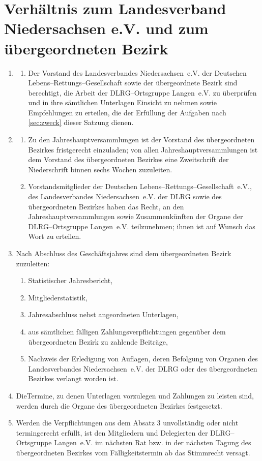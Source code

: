\documentclass[%
12pt, %
a4paper, %
headsepline, %
parskip, %
headings=normal, %
]{scrreprt}
\begin{document}
\section{Verhältnis zum Landesverband Niedersachsen e.V. und zum übergeordneten Bezirk}
\label{sec:verhaeltnis}
\begin{enumerate}
    \item \begin{enumerate}[noitemsep]
        \item Der Vorstand des Landesverbandes Niedersachsen~e.V. der Deutschen Lebens--Rettungs--Gesellschaft sowie der übergeordnete Bezirk sind berechtigt, die Arbeit der DLRG--Ortsgruppe Langen~e.V. zu überprüfen und in ihre sämtlichen Unterlagen Einsicht zu nehmen sowie Empfehlungen zu erteilen, die der Erfüllung der Aufgaben nach \ref{sec:zweck} dieser Satzung dienen.
      \end{enumerate}
    \item \begin{enumerate}[noitemsep]
        \item Zu den Jahreshauptversammlungen ist der Vorstand des übergeordneten Bezirkes fristgerecht einzuladen; von allen Jahreshauptversammlungen ist dem Vorstand des übergeordneten Bezirkes eine Zweitschrift der Niederschrift binnen sechs Wochen zuzuleiten.
        \item Vorstandsmitglieder der Deutschen Lebens--Rettungs--Gesellschaft~e.V., des Landesverbandes Niedersachsen~e.V. der DLRG sowie des übergeordneten Bezirkes haben das Recht, an den Jahreshauptversammlungen sowie Zusammenkünften der Organe der DLRG--Ortsgruppe Langen~e.V. teilzunehmen; ihnen ist auf Wunsch das Wort zu erteilen.
      \end{enumerate}
    \item Nach Abschluss des Geschäftsjahres sind dem übergeordneten Bezirk zuzuleiten: \begin{enumerate}[noitemsep]
        \item Statistischer Jahresbericht,
        \item Mitgliederstatistik,
        \item Jahresabschluss nebst angeordneten Unterlagen,
        \item aus sämtlichen fälligen Zahlungsverpflichtungen gegenüber dem übergeordneten Bezirk zu zahlende Beiträge,
        \item Nachweis der Erledigung von Auflagen, deren Befolgung von Organen des Landesverbandes Niedersachsen~e.V. der DLRG oder des übergeordneten Bezirkes verlangt worden ist.
      \end{enumerate}
    \item DieTermine, zu denen Unterlagen vorzulegen und Zahlungen zu leisten sind, werden durch die Organe des übergeordneten Bezirkes festgesetzt.
    \item Werden die Verpflichtungen aus dem Absatz 3 unvollständig oder nicht termingerecht erfüllt, ist den Mitgliedern und Delegierten der DLRG--Ortsgruppe Langen~e.V. im nächsten Rat bzw. in der nächsten Tagung des übergeordneten Bezirkes vom Fälligkeitstermin ab das Stimmrecht versagt.
\end{enumerate}
\end{document}
